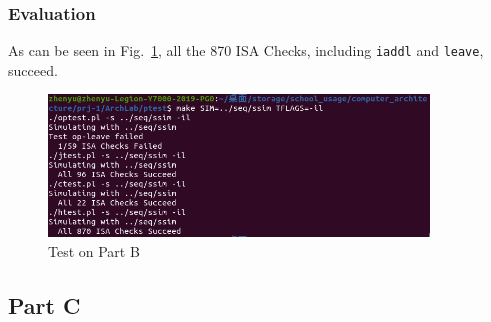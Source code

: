 \documentclass{article}
\begin{document}
\subsubsection{Evaluation}
\hspace{1 em}
\par As can be seen in Fig.~\ref{fig:partb_test}, all the 870 ISA Checks, including \lstinline{iaddl} and \lstinline{leave}, succeed.
\begin{figure}[h]
    \centering
    \includegraphics[width=0.9\textwidth]{partb_test.png}
    \caption{Test on Part B}
    \label{fig:partb_test}
\end{figure}

\subsection{Part C}
\end{document}

